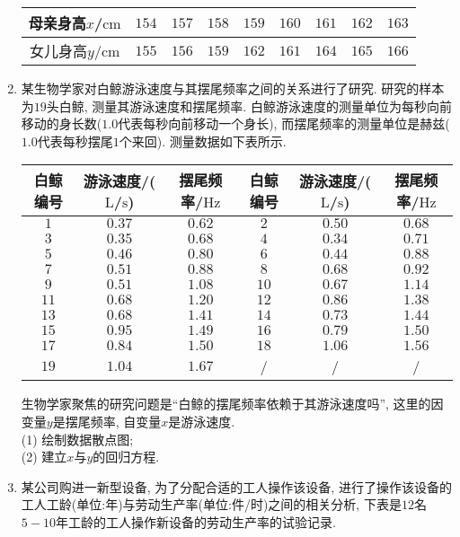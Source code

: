 \documentclass[10pt,a4paper]{article}
\begin{document}
\begin{enumerate}[1.]
\begin{center}
\begin{tabular}{|c|c|c|c|c|c|c|c|c|}
\hline
母亲身高$x$/$\text{cm}$ & $154$ & $157$ & $158$ & $159$ & $160$ & $161$ & $162$ & $163$ \\ \hline
女儿身高$y$/$\text{cm}$ & $155$ & $156$ & $159$ & $162$ & $161$ & $164$ & $165$ & $166$ \\ \hline
\end{tabular}
\end{center}
\item 某生物学家对白鲸游泳速度与其摆尾频率之间的关系进行了研究. 研究的样本为$19$头白鲸, 测量其游泳速度和摆尾频率. 白鲸游泳速度的测量单位为每秒向前移动的身长数($1.0$代表每秒向前移动一个身长), 而摆尾频率的测量单位是赫兹($1.0$代表每秒摆尾$1$个来回). 测量数据如下表所示. 
\begin{center}
\begin{longtable}{|c|c|c|c|c|c|}
\hline
白鲸编号 & 游泳速度/($\text{L}$/$\text{s}$) & 摆尾频率/$\text{Hz}$ & 白鲸编号 & 游泳速度/($\text{L}$/$\text{s}$) & 摆尾频率/$\text{Hz}$ \\ \hline
\endhead
$1$ & $0.37$ & $0.62$ & $2$ & $0.50$ & $0.68$ \\ \hline
$3$ & $0.35$ & $0.68$ & $4$ & $0.34$ & $0.71$ \\ \hline
$5$ & $0.46$ & $0.80$ & $6$ & $0.44$ & $0.88$ \\ \hline
$7$ & $0.51$ & $0.88$ & $8$ & $0.68$ & $0.92$ \\ \hline
$9$ & $0.51$ & $1.08$ & $10$ & $0.67$ & $1.14$ \\ \hline
$11$ & $0.68$ & $1.20$ & $12$ & $0.86$ & $1.38$ \\ \hline
$13$ & $0.68$ & $1.41$ & $14$ & $0.73$ & $1.44$ \\ \hline
$15$ & $0.95$ & $1.49$ & $16$ & $0.79$ & $1.50$ \\ \hline
$17$ & $0.84$ & $1.50$ & $18$ & $1.06$ & $1.56$ \\ \hline
$19$ & $1.04$ & $1.67$ & / & / & / \\ \hline
\end{longtable}
\end{center}
生物学家聚焦的研究问题是``白鲸的摆尾频率依赖于其游泳速度吗'', 这里的因变量$y$是摆尾频率, 自变量$x$是游泳速度.\\
(1) 绘制数据散点图;\\
(2) 建立$x$与$y$的回归方程.
\item 某公司购进一新型设备, 为了分配合适的工人操作该设备, 进行了操作该设备的工人工龄(单位:年)与劳动生产率(单位:件/时)之间的相关分析, 下表是$12$名$5-10$年工龄的工人操作新设备的劳动生产率的试验记录.

\end{enumerate}
\end{document}

